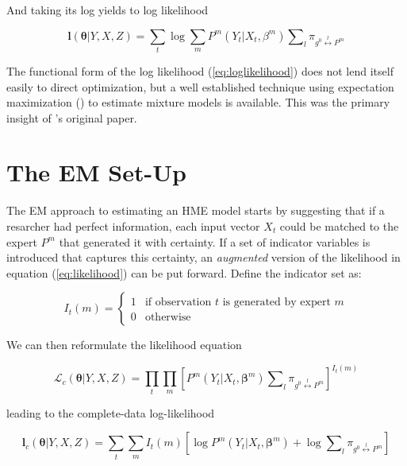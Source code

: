 \documentclass[12pt]{article}
\newcommand{\sumgateprod}[3]{\pi_{#1 \overset{#3}{\longleftrightarrow} #2}}
\newcommand{\shortsum}[1]{\sum \nolimits_{#1}}
\begin{document}
And taking its log yields to log likelihood

\begin{equation} \label{eq:loglikelihood}
  \boldsymbol{l}(\boldsymbol{\theta}|Y, X, Z) = \sum_{t}\log\sum_{m}P^{m}(Y_{t}|X_{t},\beta^{m}) \shortsum{l} \sumgateprod{g^{0}}{P^{m}}{l}
\end{equation}

The functional form of the log likelihood (\ref{eq:loglikelihood}) does not
lend itself easily to direct optimization, but a well established
technique using expectation maximization (\cite{EM_DLR1977}) to estimate mixture
models is available. This was the primary insight of \cite{JordanJacobs1993}'s
original paper.


\section{The EM Set-Up} \label{sec:Estimation}

The EM approach to estimating an HME model starts by suggesting that if a
resarcher had perfect information, each input vector $X_{t}$ could be matched
to the expert $P^{m}$ that generated it with certainty. If a set of indicator
variables is introduced that captures this certainty, an \textit{augmented}
version of the likelihood in equation (\ref{eq:likelihood}) can be put forward.
Define the indicator set as:

\begin{equation} \label{eq:indicator}
  I_{t}(m) = \begin{cases} 
     1 & \textrm{if observation $t$ is generated by expert $m$} \\
     0 & \textrm{otherwise}
             \end{cases}
\end{equation}

We can then reformulate the likelihood equation

\begin{equation}  \label{eq:auglikelihood}
  \mathcal{L}_{c}(\boldsymbol{\theta}|Y, X, Z) = \prod_{t} \prod_{m} \left[ P^{m}(Y_{t}|X_{t}, \boldsymbol{\beta}^{m}) \shortsum{l} \sumgateprod{g^{0}}{P^{m}}{l} \right]^{I_{t}(m)}
\end{equation}

leading to the complete-data log-likelihood

\begin{equation}  \label{eq:augloglikelihood}
  \boldsymbol{l}_{c}(\boldsymbol{\theta}|Y, X, Z) = \sum_{t} \sum_{m} I_{t}(m) \left[\log P^{m}(Y_{t}|X_{t}, \boldsymbol{\beta}^{m}) + \log \shortsum{l} \sumgateprod{g^{0}}{P^{m}}{l} \right]
\end{equation}
\end{document}
